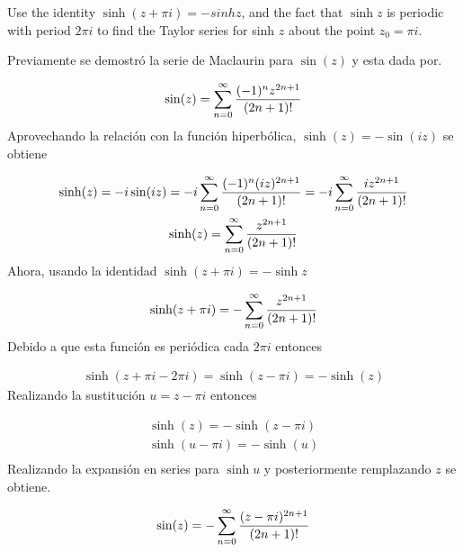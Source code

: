 \begin{problem}{3}
    Use the identity $\sinh(z + \pi i) = - sinh z$, and the fact that $\sinh z$ is periodic with period $2\pi i$ to find the Taylor series for sinh $z$ about the point $z_0 = \pi i$.
\end{problem}

Previamente se demostró la serie de Maclaurin para $\sin(z)$ y esta dada por.

\begin{gather*}
    \sin(z) = \sum_{n = 0}^{\infty} \frac{(-1)^n z^{2n+1}}{(2n+1)!}
\end{gather*}
Aprovechando la relación con la función hiperbólica, $\sinh(z) = -\sin(iz)$ se obtiene

\begin{gather*}
    \sinh(z)= -i\sin(iz) = -i\sum_{n = 0}^{\infty} \frac{(-1)^n (iz)^{2n+1}}{(2n+1)!} =  -i\sum_{n = 0}^{\infty} \frac{iz^{2n+1}}{(2n+1)!}\\
    \sinh(z)=  \sum_{n = 0}^{\infty} \frac{z^{2n+1}}{(2n+1)!}
\end{gather*}
Ahora, usando la identidad $\sinh(z + \pi i) = -\sinh z$

\begin{gather*}
    \sinh(z + \pi i) = -  \sum_{n = 0}^{\infty} \frac{z^{2n+1}}{(2n+1)!}
\end{gather*}
Debido a que esta función es periódica cada $2\pi i$ entonces 

\begin{gather}
    \sinh(z + \pi i - 2\pi i) = \sinh(z - \pi i) = -\sinh(z)
\end{gather}
Realizando la sustitución $u = z- \pi i$ entonces 

\begin{gather*}
    \sinh(z) = -\sinh(z - \pi i)\\
    \sinh(u-\pi i) = - \sinh(u)\\
\end{gather*}
Realizando la expansión en series para $\sinh u$ y posteriormente remplazando $z$ se obtiene.

\begin{mdframed}
    \vspace{-0.4cm}
    \begin{gather}
        \sin(z) = - \sum_{n = 0}^{\infty} \frac{(z- \pi i)^{2n+1}}{(2n+1)!} 
    \end{gather}
\end{mdframed}